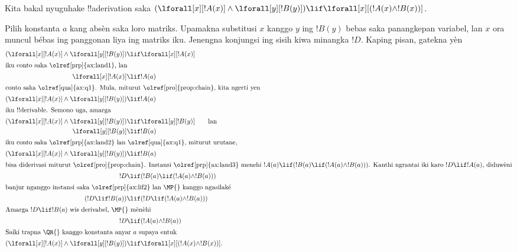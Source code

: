 \documentclass[../../../include/open-logic-section]{subfiles}
\begin{document}


\begin{ex}
Kita bakal nyuguhake !!a{derivation} saka $(\lforall[x][!A(x)] \land
\lforall[y][!B(y)]) \lif \lforall[x][(!A(x) \land !B(x))]$.

Pilih konstanta $a$ kang absèn saka loro matriks.
Upamakna substitusi $x$ kanggo $y$ ing $!B(y)$ bebas saka
panangkepan variabel, lan $x$ ora muncul bébas ing panggonan liya ing
matriks iku. Jenengna konjungsi ing sisih kiwa minangka $!D$.
Kaping pisan, gatekna yèn
\begin{align*}
  (\lforall[x][!A(x)] \land \lforall[y][!B(y)]) & \lif \lforall[x][!A(x)]\\
  \intertext{iku conto saka \olref[prp]{ax:land1}, lan}
  \lforall[x][!A(x)] & \lif !A(a) \\
  \intertext{conto saka \olref[qua]{ax:q1}. Mula, miturut \olref[pro]{prop:chain}, kita ngerti yen}
  (\lforall[x][!A(x)] \land \lforall[y][!B(y)]) & \lif !A(a) \\
  \intertext{iku !!{derivable}. Semono uga, amarga}
  (\lforall[x][!A(x)] \land \lforall[y][!B(y)]) & \lif \lforall[y][!B(y)] \qquad\text{lan}\\
    \lforall[y][!B(y)] & \lif !B(a)\\
    \intertext{iku conto saka \olref[prp]{ax:land2} lan \olref[qua]{ax:q1}, miturut urutane,}
    (\lforall[x][!A(x)] \land \lforall[y][!B(y)]) & \lif !B(a)\\
    \intertext{bisa diderivasi miturut \olref[pro]{prop:chain}.
    Instansi \olref[prp]{ax:land3} menehi $!A(a)\lif(!B(a)\lif(!A(a)\land !B(a)))$.
    Kanthi ngrantai iki karo $!D\lif !A(a)$, diduwèni}
    !D &\lif (!B(a)\lif(!A(a)\land !B(a)))\\
    \intertext{banjur nganggo instansi saka \olref[prp]{ax:lif2} lan \MP{} kanggo ngasilaké}
    (!D\lif !B(a)) &\lif (!D\lif(!A(a)\land !B(a)))\\
    \intertext{Amarga $!D\lif !B(a)$ wis derivabel, \MP{} mènèhi}
    !D &\lif (!A(a)\land !B(a))\\
    \intertext{Saiki trapna \QR{} kanggo konstanta anyar $a$ supaya entuk}
(\lforall[x][!A(x)] \land \lforall[y][!B(y)]) & \lif \lforall[x][(!A(x) \land !B(x))].
\end{align*}
\end{ex}
\end{document}
